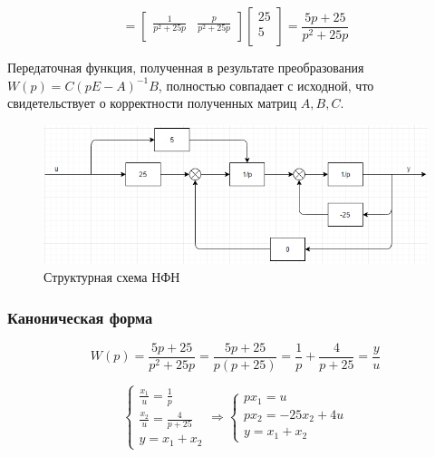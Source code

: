 \documentclass[14pt,a4paper,report]{report}
\begin{document}
\begin{equation*}
\text{$=\begin{bmatrix}
\frac{1}{p^2+25p} & \frac{p}{p^2+25p} \\
\end{bmatrix}\begin{bmatrix}
25 \\
5 \\
\end{bmatrix}=\frac{5p+25}{p^2+25p}
$}
\end{equation*}

Передаточная функция, полученная в результате преобразования $W(p)=C(pE-A)^{-1}B$, полностью совпадает с исходной, что свидетельствует о корректности полученных матриц  $A, B, C$. 

\clearpage

\begin{figure}[h!]
	\centering
	\includegraphics[scale = 0.67]{images/nfn.png}
	\caption{Структурная схема НФН}
	\label{image:2}
\end{figure}

\subsubsection{Каноническая форма}

\begin{equation*}
\text{$W(p)=\frac{5p+25}{p^2+25p}=\frac{5p+25}{p(p+25)}=\frac{1}{p}+\frac{4}{p+25}=\frac{y}{u}$}
\end{equation*}

\begin{equation*}
\begin{cases}
	\text{$\frac{x_1}{u}=\frac{1}{p}$} \\
	\text{$\frac{x_2}{u}=\frac{4}{p+25}$} \\
	\text{$y=x_1+x_2$}
\end{cases}
\Longrightarrow
\begin{cases}
\text{$px_1=u$} \\
\text{$px_2=-25x_2+4u$} \\
\text{$y=x_1+x_2$}
\end{cases}
\end{equation*}
\end{document}
